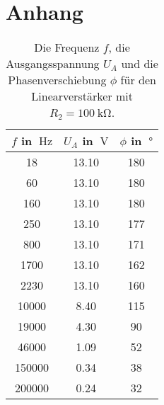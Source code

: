 \section{Anhang}
\label{sec:Anhang}

\begin{table}
    \centering
    \begin{tabular}{c c c  }
        \toprule
        $f$ in $\qty{}{\hertz}$ & $U_A$ in $\qty{}{\V}$ & $\phi$ in $\qty{}{\degree} $\\
        \midrule   
        18&     13.10&  180 \\
        60&     13.10&  180 \\
        160&    13.10&  180 \\
        250&    13.10&  177 \\
        800&    13.10&  171 \\
        1700&   13.10&  162 \\
        2230&   13.10&  160 \\
        10000&  8.40&   115 \\
        19000&  4.30&   90  \\
        46000&  1.09&   52  \\
        150000& 0.34&   38  \\
        200000& 0.24&   32  \\
        \bottomrule 
    \end{tabular}
    \caption{Die Frequenz $f$, die Ausgangsspannung $U_A$
     und die Phasenverschiebung $\phi$ für den Linearverstärker mit $R_2=\qty{100}{\kilo\ohm}$.}
    \label{tab:m1}
\end{table}

